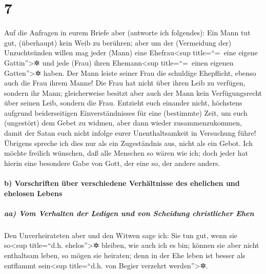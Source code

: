 \hypertarget{section-6}{%
\section{7}\label{section-6}}

 Auf die Anfragen in eurem Briefe aber (antworte ich
folgendes): Ein Mann tut gut, (überhaupt) kein Weib zu berühren;
 aber um der (Vermeidung der) Unzuchtsünden willen mag
jeder (Mann) eine Ehefrau\textless sup title=``=~eine eigene
Gattin''\textgreater✲ und jede (Frau) ihren Ehemann\textless sup
title=``=~einen eigenen Gatten''\textgreater✲ haben.  Der
Mann leiste seiner Frau die schuldige Ehepflicht, ebenso auch die Frau
ihrem Manne!  Die Frau hat nicht über ihren Leib zu
verfügen, sondern ihr Mann; gleicherweise besitzt aber auch der Mann
kein Verfügungsrecht über seinen Leib, sondern die Frau. 
Entzieht euch einander nicht, höchstens aufgrund beiderseitigen
Einverständnisses für eine (bestimmte) Zeit, um euch (ungestört) dem
Gebet zu widmen, aber dann wieder zusammenzukommen, damit der Satan euch
nicht infolge eurer Unenthaltsamkeit in Versuchung führe! 
Übrigens spreche ich dies nur als ein Zugeständnis aus, nicht als ein
Gebot.  Ich möchte freilich wünschen, daß alle Menschen so
wären wie ich; doch jeder hat hierin eine besondere Gabe von Gott, der
eine so, der andere anders.

\hypertarget{b-vorschriften-uxfcber-verschiedene-verhuxe4ltnisse-des-ehelichen-und-ehelosen-lebens}{%
\paragraph{b) Vorschriften über verschiedene Verhältnisse des ehelichen
und ehelosen
Lebens}\label{b-vorschriften-uxfcber-verschiedene-verhuxe4ltnisse-des-ehelichen-und-ehelosen-lebens}}

\hypertarget{aa-vom-verhalten-der-ledigen-und-von-scheidung-christlicher-ehen}{%
\subparagraph{aa) Vom Verhalten der Ledigen und von Scheidung
christlicher
Ehen}\label{aa-vom-verhalten-der-ledigen-und-von-scheidung-christlicher-ehen}}

 Den Unverheirateten aber und den Witwen sage ich: Sie tun
gut, wenn sie so\textless sup title=``d.h. ehelos''\textgreater✲
bleiben, wie auch ich es bin;  können sie aber nicht
enthaltsam leben, so mögen sie heiraten; denn in der Ehe leben ist
besser als entflammt sein\textless sup title=``d.h. von Begier verzehrt
werden''\textgreater✲.

